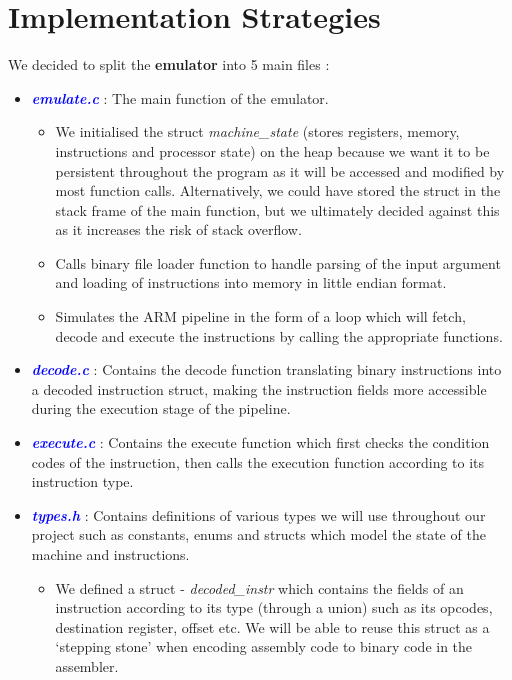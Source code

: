 \documentclass[11pt]{article}
\begin{document}
\section{Implementation Strategies}

We decided to split the \textbf{emulator} into 5 main files :

\begin{itemize}
	\item \textcolor{blue}{\textbf{\emph{emulate.c}}} : The main function of the emulator.
	\begin{itemize}
		\item We initialised the struct \emph{machine\_state} (stores registers, memory, instructions and processor state) on the heap because we want it to be persistent throughout the program as it will be 			  accessed and modified by most function calls. Alternatively, we could have stored the struct in the stack frame of the main function, but we ultimately decided against this as it increases the risk 			  of stack overflow.
		\item Calls binary file loader function to handle parsing of the input argument and loading of instructions into memory in little endian format.
		\item Simulates the ARM pipeline in the form of a loop which will fetch, decode and execute the instructions by calling the appropriate functions.
	\end{itemize}
	\item \textcolor{blue}{\textbf{\emph{decode.c}}} : Contains the decode function translating binary instructions into a decoded instruction struct, making the instruction fields more accessible during the 									     			   execution stage of the pipeline.
	\item \textcolor{blue}{\textbf{\emph{execute.c}}} : Contains the execute function which first checks the condition codes of the instruction, then calls the execution function according to its instruction 														type. 
	\item \textcolor{blue}{\textbf{\emph{types.h}}} : Contains definitions of various types we will use throughout our project such as constants, enums and structs which model the state of the machine and 														  instructions.
	\begin{itemize}
		\item We defined a struct - \emph{decoded\_instr} which contains the fields of an instruction according to its type (through a union)  such as its opcodes, destination register, offset etc. We will be 				  able to reuse this struct as a ‘stepping stone’ when encoding assembly code to binary code in the assembler.

\end{itemize}
\end{itemize}
\end{document}
